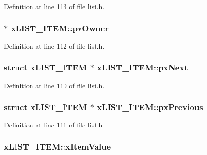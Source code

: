 Definition at line 113 of file list.\-h.

\hypertarget{structx_l_i_s_t___i_t_e_m_ae639b0b2b1b9da88a3751b2a28251762}{
\subsubsection[{pv\-Owner}]{ $\ast$ x\-L\-I\-S\-T\-\_\-\-I\-T\-E\-M\-::pv\-Owner}}\label{structx_l_i_s_t___i_t_e_m_ae639b0b2b1b9da88a3751b2a28251762}


Definition at line 112 of file list.\-h.

\hypertarget{structx_l_i_s_t___i_t_e_m_a20d5193f97c0b4a97ed4d775c9f426c2}{
\subsubsection[{px\-Next}]{\setlength{\rightskip}{0pt plus 5cm}struct {\bf x\-L\-I\-S\-T\-\_\-\-I\-T\-E\-M} $\ast$ x\-L\-I\-S\-T\-\_\-\-I\-T\-E\-M\-::px\-Next}}\label{structx_l_i_s_t___i_t_e_m_a20d5193f97c0b4a97ed4d775c9f426c2}


Definition at line 110 of file list.\-h.

\hypertarget{structx_l_i_s_t___i_t_e_m_aeda74c3938147a5f1a26711733298c45}{
\subsubsection[{px\-Previous}]{\setlength{\rightskip}{0pt plus 5cm}struct {\bf x\-L\-I\-S\-T\-\_\-\-I\-T\-E\-M} $\ast$ x\-L\-I\-S\-T\-\_\-\-I\-T\-E\-M\-::px\-Previous}}\label{structx_l_i_s_t___i_t_e_m_aeda74c3938147a5f1a26711733298c45}


Definition at line 111 of file list.\-h.

\hypertarget{structx_l_i_s_t___i_t_e_m_ae405228a5af48347ce8e99d75a3e7f72}{
\subsubsection[{x\-Item\-Value}]{ x\-L\-I\-S\-T\-\_\-\-I\-T\-E\-M\-::x\-Item\-Value}}\label{structx_l_i_s_t___i_t_e_m_ae405228a5af48347ce8e99d75a3e7f72}


